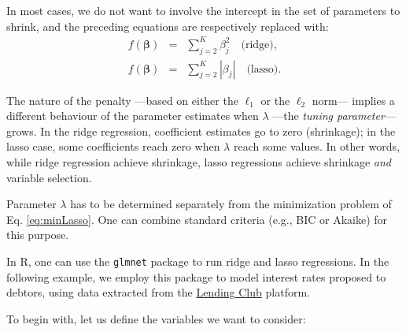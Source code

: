 \documentclass[
  12pt,
]{book}
\theoremstyle{definition}
\theoremstyle{definition}
\theoremstyle{definition}
\theoremstyle{definition}
\theoremstyle{remark}
\begin{document}
In most cases, we do not want to involve the intercept in the set of parameters to shrink, and the preceding equations are respectively replaced with:
\begin{eqnarray*}
f(\boldsymbol\beta) & = & \sum_{j=2}^K \beta_j^2 \quad \mbox{(ridge)},\\
f(\boldsymbol\beta) & = & \sum_{j=2}^K |\beta_j| \quad \mbox{(lasso)}.
\end{eqnarray*}

The nature of the penalty ---based on either the \(\ell_1\) or the \(\ell_2\) norm--- implies a different behaviour of the parameter estimates when \(\lambda\) ---the \emph{tuning parameter}--- grows. In the ridge regression, coefficient estimates go to zero (shrinkage); in the lasso case, some coefficients reach zero when \(\lambda\) reach some values. In other words, while ridge regression achieve shrinkage, lasso regressions achieve shrinkage \emph{and} variable selection.

Parameter \(\lambda\) has to be determined separately from the minimization problem of Eq. \eqref{eq:minLasso}. One can combine standard criteria (e.g., BIC or Akaike) for this purpose.

In R, one can use the \texttt{glmnet} package to run ridge and lasso regressions. In the following example, we employ this package to model interest rates proposed to debtors, using data extracted from the \href{https://www.kaggle.com/datasets/ethon0426/lending-club-20072020q1}{Lending Club} platform.

To begin with, let us define the variables we want to consider:
\end{document}
